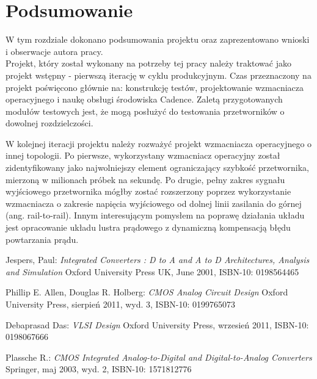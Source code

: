 \documentclass[10pt,a4paper,twoside]{report}
\theoremstyle{definition}
\theoremstyle{definition}
\theoremstyle{definition}
\theoremstyle{definition}
\theoremstyle{definition}
\begin{document}
{{{{{{{{	\chapter{Podsumowanie}
	{	W tym rozdziale dokonano podsumowania projektu oraz zaprezentowano wnioski i obserwacje autora pracy.}
	\newline \\ 

	{	Projekt, który został wykonany na potrzeby tej pracy należy traktować jako projekt wstępny - pierwszą iterację w cyklu produkcyjnym. Czas przeznaczony na projekt poświęcono głównie na: konstrukcję testów, projektowanie wzmacniacza operacyjnego i naukę obsługi środowiska Cadence. Zaletą przygotowanych modułów testowych jest, że mogą posłużyć do testowania przetworników o dowolnej rozdzielczości.}

	{	W kolejnej iteracji projektu należy rozważyć projekt wzmacniacza operacyjnego o innej topologii. Po pierwsze, wykorzystany wzmacniacz operacyjny został zidentyfikowany jako najwolniejszy element ograniczający szybkość przetwornika, mierzoną w milionach próbek na sekundę. Po drugie, pełny zakres sygnału wyjściowego przetwornika mógłby zostać rozszerzony poprzez wykorzystanie wzmacniacza o zakresie napięcia wyjściowego od dolnej linii zasilania do górnej (ang. rail-to-rail). Innym interesującym pomysłem na poprawę działania układu jest opracowanie układu lustra prądowego z dynamiczną kompensacją błędu powtarzania prądu. }

\begin{thebibliography}{9}
	\label{sec:bib}
	Jespers, Paul: 
	\textit{Integrated Converters : D to A and A to D Architectures, Analysis and Simulation}
	Oxford University Press UK, June 2001, ISBN-10: 0198564465
	
	Phillip E. Allen, Douglas R. Holberg:
	\textit{CMOS Analog Circuit Design}
	Oxford University Press, sierpień 2011, wyd. 3, ISBN-10: 0199765073
	
	Debaprasad Das:
	\textit{VLSI Design}
	Oxford University Press, wrzesień 2011, ISBN-10: 0198067666

	Plassche R.: 
	\textit{CMOS Integrated Analog-to-Digital and Digital-to-Analog Converters}
	Springer, maj 2003, wyd. 2, ISBN-10: 1571812776
	
\end{thebibliography}
	\listoffigures

}}}}}}}}
\end{document}
